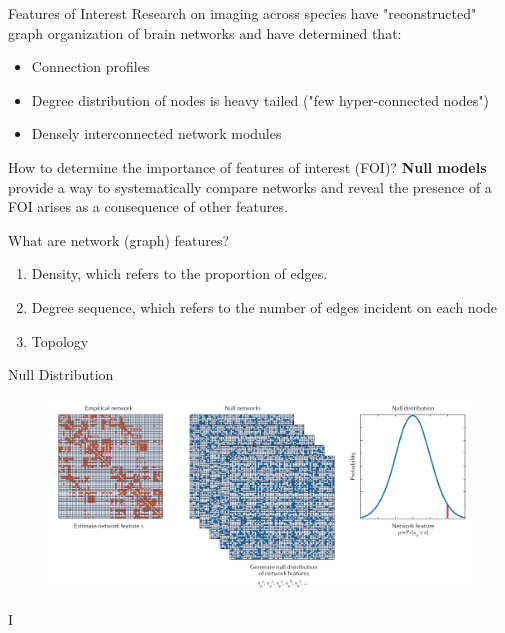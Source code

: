 \documentclass{beamer}
\begin{document}
	
	\begin{frame}{Features of Interest}
		Research on imaging across species have "reconstructed" graph organization of brain networks and have determined that:
		\begin{itemize}
			\item Connection profiles
			\item Degree distribution of nodes is heavy tailed ("few hyper-connected nodes")
			\item Densely interconnected network modules
		\end{itemize}
		How to determine the importance of features of interest (FOI)?
		\textbf{Null models} provide a way to systematically compare networks and reveal the presence of a FOI arises as a consequence of other features.
		
		What are network (graph) features?
		\begin{enumerate}
			\item Density, which refers to the proportion of edges.
			\item Degree sequence, which refers to the number of edges incident on each node
			\item Topology 
		\end{enumerate}
		 		
	\end{frame}
	
	\begin{frame}{Null Distribution}
		\begin{figure}[h]
			\centering
				\includegraphics[scale=0.4]{../Figures/fig_null_models_1.png}
		\end{figure}
		
		I
	\end{frame}
	
\end{document}
